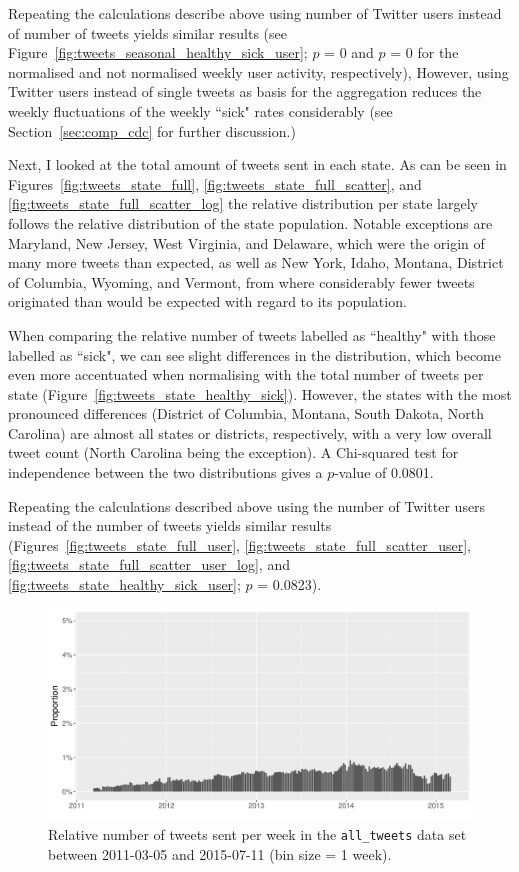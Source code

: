 \documentclass[11pt, a4paper,twoside]{report}\usepackage[]{graphicx}\usepackage[]{color}
\begin{document}
Repeating the calculations describe above using number of Twitter users instead of number of tweets yields similar results (see Figure~\ref{fig:tweets_seasonal_healthy_sick_user}; $p$ = 0 and $p$ = 0 for the normalised and not normalised weekly user activity, respectively), However, using Twitter users instead of single tweets as basis for the aggregation reduces the weekly fluctuations of the weekly ``sick" rates considerably (see Section~\ref{sec:comp_cdc} for further discussion.)

Next, I looked at the total amount of tweets sent in each state. As can be seen in Figures~\ref{fig:tweets_state_full}, \ref{fig:tweets_state_full_scatter}, and \ref{fig:tweets_state_full_scatter_log} the relative distribution per state largely follows the relative distribution of the state population. Notable exceptions are Maryland, New Jersey, West Virginia, and Delaware, which were the origin of many more tweets than expected, as well as New York, Idaho, Montana, District of Columbia, Wyoming, and Vermont, from where considerably fewer tweets originated than would be expected with regard to its population.

When comparing the relative number of tweets labelled as ``healthy" with those labelled as ``sick", we can see slight differences in the distribution, which become even more accentuated when normalising with the total number of tweets per state (Figure~\ref{fig:tweets_state_healthy_sick}). However, the states with the most pronounced differences (District of Columbia, Montana, South Dakota, North Carolina) are almost all states or districts, respectively, with a very low overall tweet count (North Carolina being the exception). A Chi-squared test for independence between the two distributions gives a $p$-value of 0.0801. 

Repeating the calculations described above using the number of Twitter users instead of the number of tweets yields similar results (Figures~\ref{fig:tweets_state_full_user}, \ref{fig:tweets_state_full_scatter_user}, \ref{fig:tweets_state_full_scatter_user_log}, and \ref{fig:tweets_state_healthy_sick_user}; $p$ = 0.0823).\clearpage

\begin{figure}[htbp!]
\centering
\includegraphics[width=1\linewidth]{11_activity_total_date_Twitter_full_aggregated.pdf}
\caption{Relative number of tweets sent per week in the \texttt{all\_tweets} data set between 2011-03-05 and 2015-07-11 (bin size = 1 week).}
\label{fig:tweets_seasonal_full}
\end{figure}
\end{document}
